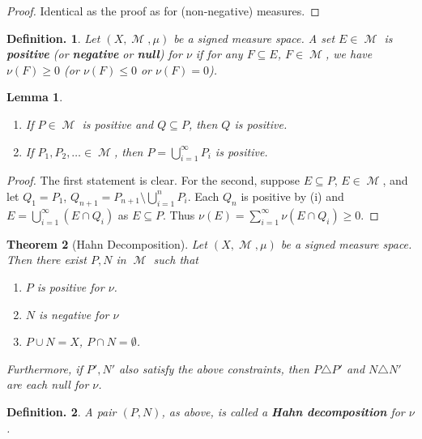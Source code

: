 \documentclass[12pt, a4paper]{memoir}
\newtheorem{theorem}{Theorem}[section]
\newtheorem{lemma}[theorem]{Lemma}
\theoremstyle{nonumberplain}
\newtheorem{definition}{Definition.}
\newtheorem{proof}{Proof}
\DeclareMathOperator{\M}{\mathcal{M}}
\begin{document}
\begin{proof}
    Identical as the proof as for (non-negative) measures.
\end{proof}
\begin{definition}
    Let $(X,\M,\mu)$ be a signed measure space.
    A set $E\in\M$ is \textbf{positive} (or \textbf{negative} or \textbf{null}) for $\nu$ if for any $F\subseteq E$, $F\in\M$, we have $\nu(F)\geq 0$ (or $\nu(F)\leq 0$ or $\nu(F)=0$).
\end{definition}
\begin{lemma}
    \begin{enumerate}[nolistsep,label=(\roman*)]
        \item If $P\in\M$ is positive and $Q\subseteq P$, then $Q$ is positive.
        \item If $P_1,P_2,\ldots\in\M$, then $P=\bigcup_{i=1}^\infty P_i$ is positive.
    \end{enumerate}
\end{lemma}
\begin{proof}
    The first statement is clear.
    For the second, suppose $E\subseteq P$, $E\in\M$, and let $Q_1=P_1$, $Q_{n+1}=P_{n+1}\setminus\bigcup_{i=1}^n P_i$.
    Each $Q_n$ is positive by (i) and $E=\bigcup_{i=1}^\infty(E\cap Q_i)$ as $E\subseteq P$.
    Thus $\nu(E)=\sum_{i=1}^\infty\nu(E\cap Q_i)\geq 0$.
\end{proof}
\begin{theorem}[Hahn Decomposition]
    Let $(X,\M,\mu)$ be a signed measure space.
    Then there exist $P,N$ in $\M$ such that
    \begin{enumerate}[nolistsep,label=(\roman*)]
        \item $P$ is positive for $\nu$.
        \item $N$ is negative for $\nu$
        \item $P\cup N=X$, $P\cap N=\emptyset$.
    \end{enumerate}
    Furthermore, if $P',N'$ also satisfy the above constraints, then $P\triangle P'$ and $N\triangle N'$ are each null for $\nu$.
\end{theorem}
\begin{definition}
    A pair $(P,N)$, as above, is called a \textbf{Hahn decomposition} for $\nu$.
\end{definition}
\end{document}
